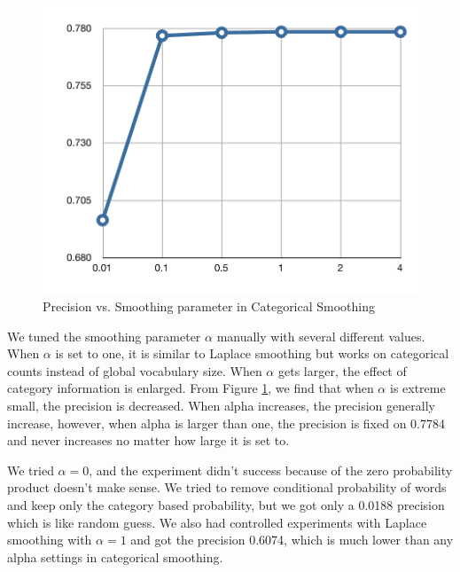 \begin{figure}[ht]
\vskip 0.2in
\begin{center}
\centerline{\includegraphics[width=\columnwidth]{pvsalpha}}
\caption{Precision vs. Smoothing parameter in Categorical Smoothing}
\label{fig-p-vs-alpha}
\end{center}
\vskip -0.2in
\end{figure}

We tuned the smoothing parameter $\alpha$ manually with several different values. When $\alpha$ is set to one, it is similar to Laplace smoothing but works on categorical counts instead of global vocabulary size. When $\alpha$ gets larger, the effect of category information is enlarged. From Figure \ref{fig-p-vs-alpha}, we find that when $\alpha$ is extreme small, the precision is decreased. When alpha increases, the precision generally increase, however, when alpha is larger than one, the precision is fixed on 0.7784 and never increases no matter how large it is set to.

We tried $\alpha=0$, and the experiment didn't success because of the zero probability product doesn't make sense. We tried to remove conditional probability of words and keep only the category based probability, but we got only a 0.0188 precision which is like random guess. We also had controlled experiments with Laplace smoothing with $\alpha=1$ and got the precision 0.6074, which is much lower than any alpha settings in categorical smoothing. 



